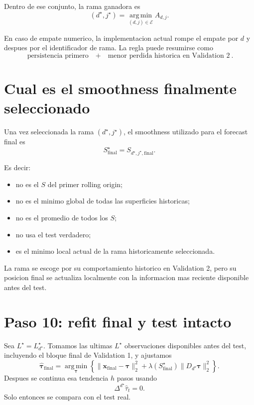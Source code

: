 \documentclass[11pt]{article}
\newcommand{\D}{\Delta}
\newcommand{\argmin}{\operatorname*{arg\,min}}
\begin{document}
Dentro de ese conjunto, la rama ganadora es
\begin{equation}
(d^\star,j^\star)
=
\argmin_{(d,j)\in\mathcal{E}}
A_{d,j}.
\label{eq:winner}
\end{equation}

En caso de empate numerico, la implementacion actual rompe el empate por
\(d\) y despues por el identificador de rama. La regla puede resumirse como
\[
\boxed{
\text{persistencia primero}
\quad+\quad
\text{menor perdida historica en Validation 2}
}.
\]

\section{Cual es el smoothness finalmente seleccionado}

Una vez seleccionada la rama \((d^\star,j^\star)\), el smoothness utilizado para
el forecast final es
\begin{equation}
\boxed{
S_{\mathrm{final}}^\star
=
S_{d^\star,j^\star,\mathrm{final}}.
}
\label{eq:finalS}
\end{equation}

Es decir:
\begin{itemize}[leftmargin=2em]
    \item no es el \(S\) del primer rolling origin;
    \item no es el minimo global de todas las superficies historicas;
    \item no es el promedio de todos los \(S\);
    \item no usa el test verdadero;
    \item es el minimo local actual de la rama historicamente seleccionada.
\end{itemize}

La rama se escoge por su comportamiento historico en Validation 2, pero su
posicion final se actualiza localmente con la informacion mas reciente
disponible antes del test.

\section{Paso 10: refit final y test intacto}

Sea \(L^\star=L_{d^\star}^\star\). Tomamos las ultimas \(L^\star\)
observaciones disponibles antes del test, incluyendo el bloque final de
Validation 1, y ajustamos
\begin{equation}
\widehat{\bm{\tau}}_{\mathrm{final}}
=
\argmin_{\bm{\tau}}
\left\{
\|\bm{x}_{\mathrm{final}}-\bm{\tau}\|_2^2
+
\lambda(S_{\mathrm{final}}^\star)
\|D_{d^\star}\bm{\tau}\|_2^2
\right\}.
\label{eq:finalfit}
\end{equation}
Despues se continua esa tendencia \(h\) pasos usando
\[
\D^{d^\star}\widehat{\tau}_t=0.
\]
Solo entonces se compara con el test real.
\end{document}
